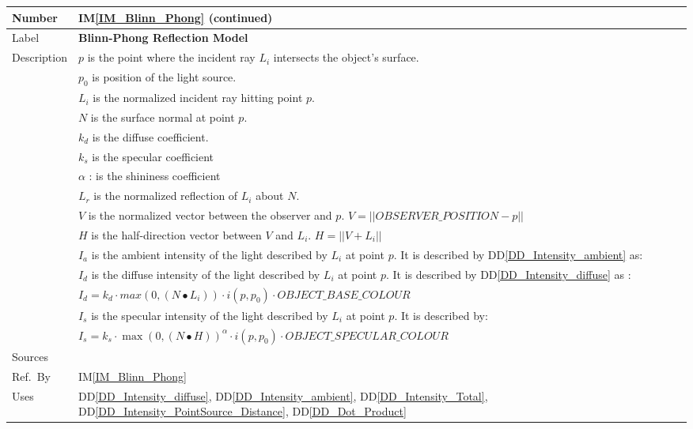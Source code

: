 \documentclass[12pt]{article}
\newcommand{\colAwidth}{0.13\textwidth}
\newcommand{\colBwidth}{0.82\textwidth}
\newcommand{\ddref}[1]{DD\ref{#1}}
\newcommand{\iref}[1]{IM\ref{#1}}
\begin{document}
\begin{minipage}{\textwidth}
	\renewcommand*{\arraystretch}{1.5}
	\begin{tabular}{| p{\colAwidth} | p{\colBwidth}|}
		\hline
		\rowcolor[gray]{0.9}
		Number& \iref{IM_Blinn_Phong} (continued)\\
		\hline
		Label& \bf Blinn-Phong Reflection Model\\
		\hline
		Description & $p$ is the point where the incident ray $L_{i}$ 
		intersects the 	object's surface.\\
		& $p_{0}$ is position of the light source. \\				
		& $L_{i}$ is the normalized incident ray hitting point $p$.\\
		& $N$ is the surface normal at point $p$.\\
		& $k_{d}$ is the diffuse coefficient.\\
		& $k_{s}$ is the specular coefficient\\
		& $\alpha$ : is the shininess coefficient\\		
		& $L_{r}$ is the normalized reflection of $L_{i}$ about $N$.\\
		& $V$ is the normalized vector between the observer and $p$. $V = 
		||OBSERVER\_POSITION - p||$\\
		& $H$ is the half-direction vector between $V$ and $L_{i}$. $H = 
		||V+L_{i}||$\\		
		& $I_{a}$ is the ambient intensity of the light described by 
		$L_{i}$ at point $p$. It is described by 
		\ddref{DD_Intensity_ambient} as:\\
		& $I_{d}$ is the diffuse intensity of the light described by 
		$L_{i}$ at point $p$. It is described by 
		\ddref{DD_Intensity_diffuse} as : \\
		& $I_{d} = k_{d}\cdot max(0, (N \bullet 
		L_{i}))\cdot i(p,p_{0})\cdot OBJECT\_BASE\_COLOUR$ \\
		& $I_{s}$ is the specular intensity of the light described by 
		$L_{i}$ at point $p$. It is described by: \\
		& $I_{s} = k_{s} \cdot \max(0, (N \bullet H))^\alpha \cdot
		i(p,p_{0}) \cdot OBJECT\_SPECULAR\_COLOUR$ \\
		\hline
		Sources& \cite{Comninos2005,Lengyel2003,shreiner2012} \\
		\hline
		Ref.\ By & \iref{IM_Blinn_Phong}\\
		\hline
		Uses & \ddref{DD_Intensity_diffuse}, 
		\ddref{DD_Intensity_ambient}, \ddref{DD_Intensity_Total}, 
		\ddref{DD_Intensity_PointSource_Distance}, \ddref{DD_Dot_Product} \\
		\hline
	\end{tabular}
\end{minipage}\\
\end{document}
